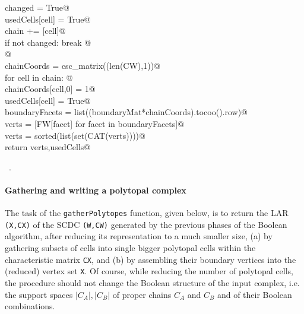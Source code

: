 \documentclass[11pt,oneside]{article}	%
\begin{document}
\begin{flushleft}
\begin{list}{}{}
\mbox{}\verb@               changed = True@\\
\mbox{}\verb@               usedCells[cell] = True@\\
\mbox{}\verb@               chain += [cell]@\\
\mbox{}\verb@      if not changed: break      @\\
\mbox{}\verb@         @\\
\mbox{}\verb@   chainCoords = csc_matrix((len(CW),1))@\\
\mbox{}\verb@   for cell in chain: @\\
\mbox{}\verb@      chainCoords[cell,0] = 1@\\
\mbox{}\verb@      usedCells[cell] = True@\\
\mbox{}\verb@   boundaryFacets = list((boundaryMat*chainCoords).tocoo().row)@\\
\mbox{}\verb@   verts = [FW[facet] for facet in boundaryFacets]@\\
\mbox{}\verb@   verts = sorted(list(set(CAT(verts))))@\\
\mbox{}\verb@   return verts,usedCells@\\
\mbox{}\verb@@{\NWsep}
\end{list}
\vspace{-1ex}
\footnotesize\addtolength{\baselineskip}{-1ex}
\begin{list}{}{\setlength{\itemsep}{-\parsep}\setlength{\itemindent}{-\leftmargin}}
\item \NWtxtMacroRefIn\ .
\end{list}
\end{flushleft}

\paragraph{Gathering and writing a polytopal complex}
The task of the \texttt{gatherPolytopes} function, given below, is to return the LAR \texttt{(X,CX)} of the SCDC \texttt{(W,CW)} generated by the previous phases of the Boolean algorithm, after reducing its representation to a much smaller size, (a) by gathering subsets of cells into single bigger polytopal cells within the characteristic matrix \texttt{CX}, and (b) by assembling their boundary vertices into the (reduced) vertex set \texttt{X}. Of course, while reducing the number of polytopal cells, the procedure should not change the Boolean structure of the input complex, i.e. the support spaces $|C_A|, |C_B|$ of proper chains $C_A$ and $C_B$ and of their Boolean combinations.
\end{document}
